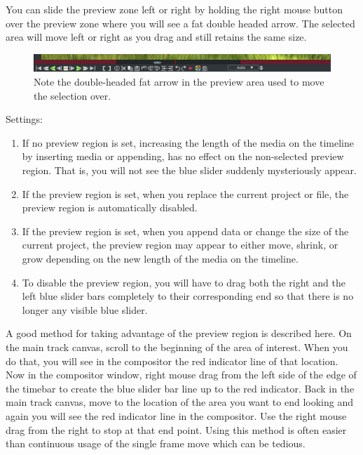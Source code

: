 You can slide the preview zone left or right by holding the right mouse button over the preview zone where you will see a fat double headed arrow.  
The selected area will move left or right as you drag and still retains the same size.

\begin{figure}[htpb]
    \centering
    \includegraphics[width=0.8\linewidth]{images/timebar4.png}
    \caption{Note the double-headed fat arrow in the preview area used  to move the selection over.}
    \label{fig:timebar4}
\end{figure}

Settings:

\begin{enumerate}
    \item  If no preview region is set, increasing the length of the media on the timeline by inserting media or
        appending, has no effect on the non-selected preview region.  That is, you will not see the blue slider
        suddenly mysteriously appear.
    \item  If the preview region is set, when you replace the current project or file,  the preview region is
        automatically disabled.
    \item  If the preview region is set, when you append data or change the size of the current project, the
        preview region may appear to either move, shrink, or grow depending on the new length of the
        media on the timeline.  
    \item  To disable the preview region, you will have to drag both the right and the left blue slider bars
        completely to their corresponding end so that there is no longer any visible blue slider.
\end{enumerate}

A good method for taking advantage of the preview region is described here.  
On the main track canvas, scroll to the beginning of the area of interest.  
When you do that, you will see in the compositor the red indicator line of that location.  
Now in the compositor window, right mouse drag from the left side of the edge of the timebar to create the blue slider bar line up to the red indicator.  
Back in the main track canvas, move to the location of the area you want to end looking and again you will see the red indicator line in the compositor.  
Use the right mouse drag from the right to stop at that end point.  Using this method is often easier than continuous usage of the single frame move which can be tedious.

